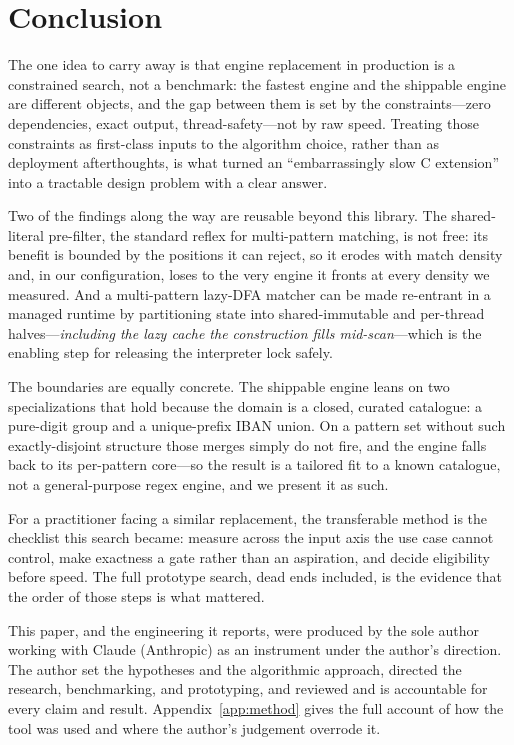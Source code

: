 \documentclass[acmsmall,nonacm,screen]{acmart}
\begin{document}
\section{Conclusion}
\label{sec:conclusion}
The one idea to carry away is that engine replacement in production is a constrained
search, not a benchmark: the fastest engine and the shippable engine are different
objects, and the gap between them is set by the constraints---zero dependencies,
exact output, thread-safety---not by raw speed. Treating those constraints as
first-class inputs to the algorithm choice, rather than as deployment afterthoughts,
is what turned an ``embarrassingly slow C extension'' into a tractable design problem
with a clear answer.

Two of the findings along the way are reusable beyond this library. The shared-literal
pre-filter, the standard reflex for multi-pattern matching, is not free: its benefit
is bounded by the positions it can reject, so it erodes with match density and, in our
configuration, loses to the very engine it fronts at every density we measured. And a
multi-pattern lazy-DFA matcher can be made re-entrant in a managed runtime by
partitioning state into shared-immutable and per-thread halves---\emph{including the
lazy cache the construction fills mid-scan}---which is the enabling step for releasing
the interpreter lock safely.

The boundaries are equally concrete. The shippable engine leans on two
specializations that hold because the domain is a closed, curated catalogue: a
pure-digit group and a unique-prefix IBAN union. On a pattern set without such
exactly-disjoint structure those merges simply do not fire, and the engine falls back
to its per-pattern core---so the result is a tailored fit to a known catalogue, not a
general-purpose regex engine, and we present it as such.

For a practitioner facing a similar replacement, the transferable method is the
checklist this search became: measure across the input axis the use case cannot
control, make exactness a gate rather than an aspiration, and decide eligibility
before speed. The full prototype search, dead ends included, is the evidence that the
order of those steps is what mattered.

\begin{acks}
This paper, and the engineering it reports, were produced by the sole author
working with Claude (Anthropic) as an instrument under the author's direction.
The author set the hypotheses and the algorithmic approach, directed the
research, benchmarking, and prototyping, and reviewed and is accountable for
every claim and result. Appendix~\ref{app:method} gives the full account of how
the tool was used and where the author's judgement overrode it.
\end{acks}
\end{document}
